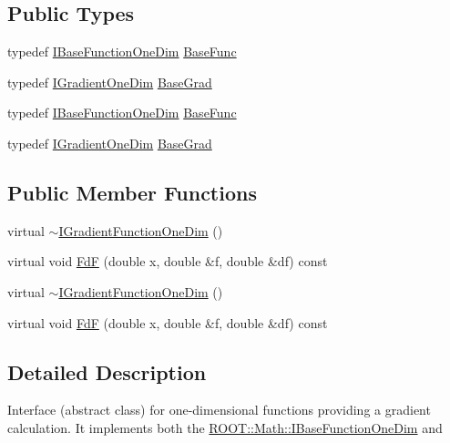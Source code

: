 \subsection*{Public Types}
\begin{DoxyCompactItemize}
\item 
typedef \mbox{\hyperlink{classROOT_1_1Math_1_1IBaseFunctionOneDim}{I\+Base\+Function\+One\+Dim}} \mbox{\hyperlink{classROOT_1_1Math_1_1IGradientFunctionOneDim_a9eae6bcbeb2d0396937710bd70bd29d0}{Base\+Func}}
\item 
typedef \mbox{\hyperlink{classROOT_1_1Math_1_1IGradientOneDim}{I\+Gradient\+One\+Dim}} \mbox{\hyperlink{classROOT_1_1Math_1_1IGradientFunctionOneDim_ab15a5262f99475c3633de251f75fbd3f}{Base\+Grad}}
\item 
typedef \mbox{\hyperlink{classROOT_1_1Math_1_1IBaseFunctionOneDim}{I\+Base\+Function\+One\+Dim}} \mbox{\hyperlink{classROOT_1_1Math_1_1IGradientFunctionOneDim_a9eae6bcbeb2d0396937710bd70bd29d0}{Base\+Func}}
\item 
typedef \mbox{\hyperlink{classROOT_1_1Math_1_1IGradientOneDim}{I\+Gradient\+One\+Dim}} \mbox{\hyperlink{classROOT_1_1Math_1_1IGradientFunctionOneDim_ab15a5262f99475c3633de251f75fbd3f}{Base\+Grad}}
\end{DoxyCompactItemize}
\subsection*{Public Member Functions}
\begin{DoxyCompactItemize}
\item 
virtual \mbox{\hyperlink{classROOT_1_1Math_1_1IGradientFunctionOneDim_ad3f64fcee51e1e51e6db9126a402ed8a}{$\sim$\+I\+Gradient\+Function\+One\+Dim}} ()
\item 
virtual void \mbox{\hyperlink{classROOT_1_1Math_1_1IGradientFunctionOneDim_a01eaedb2ae1dfa5722f11281acf7a72b}{FdF}} (double x, double \&f, double \&df) const
\item 
virtual \mbox{\hyperlink{classROOT_1_1Math_1_1IGradientFunctionOneDim_ad3f64fcee51e1e51e6db9126a402ed8a}{$\sim$\+I\+Gradient\+Function\+One\+Dim}} ()
\item 
virtual void \mbox{\hyperlink{classROOT_1_1Math_1_1IGradientFunctionOneDim_a01eaedb2ae1dfa5722f11281acf7a72b}{FdF}} (double x, double \&f, double \&df) const
\end{DoxyCompactItemize}


\subsection{Detailed Description}
Interface (abstract class) for one-\/dimensional functions providing a gradient calculation. It implements both the \mbox{\hyperlink{classROOT_1_1Math_1_1IBaseFunctionOneDim}{R\+O\+O\+T\+::\+Math\+::\+I\+Base\+Function\+One\+Dim}} and

